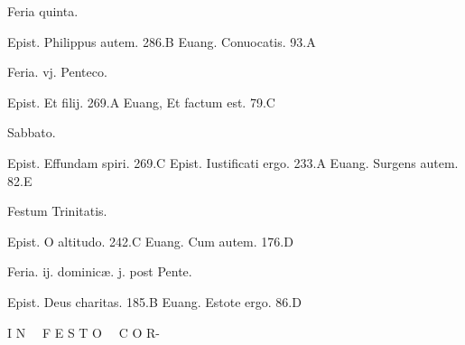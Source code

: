 \documentclass[a5paper,10pt]{book}
\def\ae{æ}
\begin{document}
\begin{multicols}{2}
\begin{center}
\color{red} Feria quinta.
\end{center}
\vspace{-.75em}
\par \noindent Epist. Philippus autem. \hfill 286.B
\newline Euang. Conuocatis. \hfill 93.A
\newline \vspace{-1.75em}
\begin{center}
\color{red} Feria. vj. Penteco.
\end{center}
\vspace{-.75em}
\par \noindent Epist. Et filij. \hfill 269.A
\newline Euang, Et factum est. \hfill 79.C%
\newline \vspace{-1.75em}
\begin{center}
\color{red} Sabbato.
\end{center}
\vspace{-.75em}
\par \noindent Epist. Effundam spiri. \hfill 269.C
\newline Epist. Iustificati ergo. \hfill 233.A
\newline Euang. Surgens autem. \hfill 82.E
\newline \vspace{-1.75em}
\begin{center}
\color{red} Festum Trinitatis.
\end{center}
\vspace{-.75em}
\par \noindent Epist. O altitudo. \hfill 242.C
\newline Euang. Cum autem. \hfill 176.D
\newline \vspace{-1.75em}
\begin{center}
\color{red} Feria. ij. dominic\ae . j. post Pente.
\end{center}
\vspace{-.75em}
\par \noindent Epist. Deus charitas. \hfill 185.B
\newline Euang. Estote ergo. \hfill 86.D
\newline \vspace{-1.25em}
\begin{center}
\color{red}  \large I N \ \ F E S T O \ \ C O R- \\

\end{center}
\end{multicols}
\end{document}
